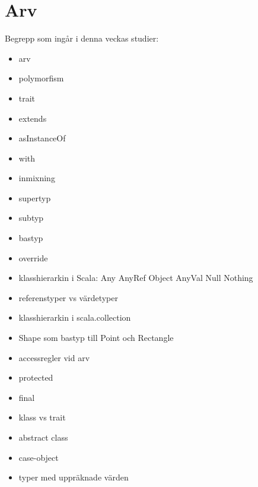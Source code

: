 \chapter{Arv}\label{chapter:W07}
Begrepp som ingår i denna veckas studier:
\begin{itemize}[noitemsep,label={$\square$},leftmargin=*]
\item arv
\item polymorfism
\item trait
\item extends
\item asInstanceOf
\item with
\item inmixning
\item supertyp
\item subtyp
\item bastyp
\item override
\item klasshierarkin i Scala: Any AnyRef Object AnyVal Null Nothing
\item referenstyper vs värdetyper
\item klasshierarkin i scala.collection
\item Shape som bastyp till Point och Rectangle
\item accessregler vid arv
\item protected
\item final
\item klass vs trait
\item abstract class
\item case-object
\item typer med uppräknade värden\end{itemize}

